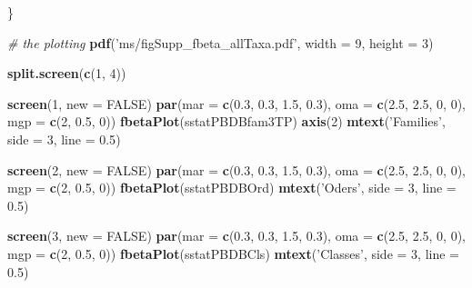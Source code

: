 \documentclass[]{article}
\newenvironment{Shaded}{\begin{snugshade}}{\end{snugshade}}
\newcommand{\KeywordTok}[1]{\textcolor[rgb]{0.13,0.29,0.53}{\textbf{#1}}}
\newcommand{\DataTypeTok}[1]{\textcolor[rgb]{0.13,0.29,0.53}{#1}}
\newcommand{\DecValTok}[1]{\textcolor[rgb]{0.00,0.00,0.81}{#1}}
\newcommand{\FloatTok}[1]{\textcolor[rgb]{0.00,0.00,0.81}{#1}}
\newcommand{\StringTok}[1]{\textcolor[rgb]{0.31,0.60,0.02}{#1}}
\newcommand{\CommentTok}[1]{\textcolor[rgb]{0.56,0.35,0.01}{\textit{#1}}}
\newcommand{\OtherTok}[1]{\textcolor[rgb]{0.56,0.35,0.01}{#1}}
\newcommand{\NormalTok}[1]{#1}
\begin{document}
\begin{Shaded}
\begin{Highlighting}[]
\NormalTok{\}}


\CommentTok{# the plotting}
\KeywordTok{pdf}\NormalTok{(}\StringTok{'ms/figSupp_fbeta_allTaxa.pdf'}\NormalTok{, }\DataTypeTok{width =} \DecValTok{9}\NormalTok{, }\DataTypeTok{height =} \DecValTok{3}\NormalTok{)}

\KeywordTok{split.screen}\NormalTok{(}\KeywordTok{c}\NormalTok{(}\DecValTok{1}\NormalTok{, }\DecValTok{4}\NormalTok{))}

\KeywordTok{screen}\NormalTok{(}\DecValTok{1}\NormalTok{, }\DataTypeTok{new =} \OtherTok{FALSE}\NormalTok{)}
\KeywordTok{par}\NormalTok{(}\DataTypeTok{mar =} \KeywordTok{c}\NormalTok{(}\FloatTok{0.3}\NormalTok{, }\FloatTok{0.3}\NormalTok{, }\FloatTok{1.5}\NormalTok{, }\FloatTok{0.3}\NormalTok{), }\DataTypeTok{oma =} \KeywordTok{c}\NormalTok{(}\FloatTok{2.5}\NormalTok{, }\FloatTok{2.5}\NormalTok{, }\DecValTok{0}\NormalTok{, }\DecValTok{0}\NormalTok{), }
    \DataTypeTok{mgp =} \KeywordTok{c}\NormalTok{(}\DecValTok{2}\NormalTok{, }\FloatTok{0.5}\NormalTok{, }\DecValTok{0}\NormalTok{))}
\KeywordTok{fbetaPlot}\NormalTok{(sstatPBDBfam3TP)}
\KeywordTok{axis}\NormalTok{(}\DecValTok{2}\NormalTok{)}
\KeywordTok{mtext}\NormalTok{(}\StringTok{'Families'}\NormalTok{, }\DataTypeTok{side =} \DecValTok{3}\NormalTok{, }\DataTypeTok{line =} \FloatTok{0.5}\NormalTok{)}

\KeywordTok{screen}\NormalTok{(}\DecValTok{2}\NormalTok{, }\DataTypeTok{new =} \OtherTok{FALSE}\NormalTok{)}
\KeywordTok{par}\NormalTok{(}\DataTypeTok{mar =} \KeywordTok{c}\NormalTok{(}\FloatTok{0.3}\NormalTok{, }\FloatTok{0.3}\NormalTok{, }\FloatTok{1.5}\NormalTok{, }\FloatTok{0.3}\NormalTok{), }\DataTypeTok{oma =} \KeywordTok{c}\NormalTok{(}\FloatTok{2.5}\NormalTok{, }\FloatTok{2.5}\NormalTok{, }\DecValTok{0}\NormalTok{, }\DecValTok{0}\NormalTok{), }
    \DataTypeTok{mgp =} \KeywordTok{c}\NormalTok{(}\DecValTok{2}\NormalTok{, }\FloatTok{0.5}\NormalTok{, }\DecValTok{0}\NormalTok{))}
\KeywordTok{fbetaPlot}\NormalTok{(sstatPBDBOrd)}
\KeywordTok{mtext}\NormalTok{(}\StringTok{'Oders'}\NormalTok{, }\DataTypeTok{side =} \DecValTok{3}\NormalTok{, }\DataTypeTok{line =} \FloatTok{0.5}\NormalTok{)}

\KeywordTok{screen}\NormalTok{(}\DecValTok{3}\NormalTok{, }\DataTypeTok{new =} \OtherTok{FALSE}\NormalTok{)}
\KeywordTok{par}\NormalTok{(}\DataTypeTok{mar =} \KeywordTok{c}\NormalTok{(}\FloatTok{0.3}\NormalTok{, }\FloatTok{0.3}\NormalTok{, }\FloatTok{1.5}\NormalTok{, }\FloatTok{0.3}\NormalTok{), }\DataTypeTok{oma =} \KeywordTok{c}\NormalTok{(}\FloatTok{2.5}\NormalTok{, }\FloatTok{2.5}\NormalTok{, }\DecValTok{0}\NormalTok{, }\DecValTok{0}\NormalTok{), }
    \DataTypeTok{mgp =} \KeywordTok{c}\NormalTok{(}\DecValTok{2}\NormalTok{, }\FloatTok{0.5}\NormalTok{, }\DecValTok{0}\NormalTok{))}
\KeywordTok{fbetaPlot}\NormalTok{(sstatPBDBCls)}
\KeywordTok{mtext}\NormalTok{(}\StringTok{'Classes'}\NormalTok{, }\DataTypeTok{side =} \DecValTok{3}\NormalTok{, }\DataTypeTok{line =} \FloatTok{0.5}\NormalTok{)}


\end{Highlighting}
\end{Shaded}
\end{document}
